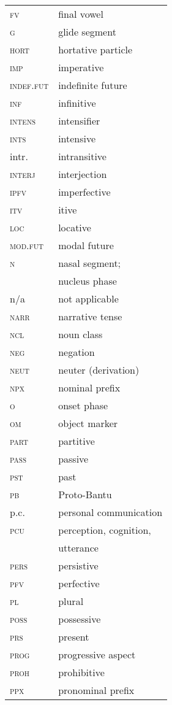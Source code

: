 \begin{multicols}{2}
\begin{tabular}{lp{4.5cm}}
\textsc{fv}&final vowel\\
\textsc{g} & glide segment\\
\textsc{hort} & hortative particle\\
\textsc{imp}&imperative\\
\textsc{indef.fut}&indefinite future\\
\textsc{inf}&infinitive\\
\textsc{intens}&intensifier\\
\textsc{ints}&intensive\\
intr.&intransitive\\
\textsc{interj}&interjection\\
\textsc{ipfv}&imperfective\\
\textsc{itv}&itive\\
\textsc{loc}&locative\\
\textsc{mod.fut}&modal future\\
\textsc{n} & nasal segment;\\
&nucleus phase\\
n/a & not applicable\\
\textsc{narr}&narrative tense\\
\textsc{ncl}&noun class\\
\textsc{neg}&negation\\
\textsc{neut}&neuter (derivation)\\
\textsc{npx}&nominal prefix\\
\textsc{o} & onset phase\\
\textsc{om} & object marker\\
\textsc{part}&partitive\\
\textsc{pass}&passive\\
\textsc{pst}&past\\
\textsc{pb} &Proto-Bantu\\
p.c. &personal communication\\
\textsc{pcu} & perception, cognition,\\
& utterance\\
\textsc{pers}&persistive\\
\textsc{pfv}&perfective\\
\textsc{pl} & plural\\ %
\textsc{poss}&possessive\\
\textsc{prs}&present\\
\textsc{prog} & progressive aspect\\
\textsc{proh}&prohibitive\\
\textsc{ppx}&pronominal prefix\\
\end{tabular}
\columnbreak


\end{multicols}
